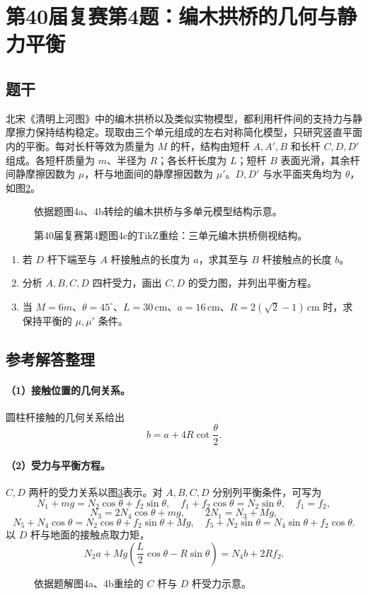 \section{第40届复赛第4题：编木拱桥的几何与静力平衡}
\subsection{题干}
北宋《清明上河图》中的编木拱桥以及类似实物模型，都利用杆件间的支持力与静摩擦力保持结构稳定。现取由三个单元组成的左右对称简化模型，只研究竖直平面内的平衡。每对长杆等效为质量为 $M$ 的杆，结构由短杆 $A,A',B$ 和长杆 $C,D,D'$ 组成。各短杆质量为 $m$、半径为 $R$；各长杆长度为 $L$；短杆 $B$ 表面光滑，其余杆间静摩擦因数为 $\mu$，杆与地面间的静摩擦因数为 $\mu'$。$D,D'$ 与水平面夹角均为 $\theta$，如图\ref{fig:cpho40q04}。
\begin{figure}[htbp]\centering

\caption{依据题图4a、4b转绘的编木拱桥与多单元模型结构示意。}\label{fig:cpho40q04context}
\end{figure}
\begin{figure}[htbp]\centering

\caption{第40届复赛第4题图4c的TikZ重绘：三单元编木拱桥侧视结构。}\label{fig:cpho40q04}
\end{figure}
\begin{enumerate}
\item 若 $D$ 杆下端至与 $A$ 杆接触点的长度为 $a$，求其至与 $B$ 杆接触点的长度 $b$。
\item 分析 $A,B,C,D$ 四杆受力，画出 $C,D$ 的受力图，并列出平衡方程。
\item 当 $M=6m$、$\theta=45^\circ$、$L=30\,\mathrm{cm}$、$a=16\,\mathrm{cm}$、$R=2(\sqrt2-1)\,\mathrm{cm}$ 时，求保持平衡的 $\mu,\mu'$ 条件。
\end{enumerate}
\subsection{参考解答整理}
\paragraph{（1）接触位置的几何关系。}圆柱杆接触的几何关系给出
\[b=a+4R\cot\frac\theta2.\]
\paragraph{（2）受力与平衡方程。} $C,D$ 两杆的受力关系以图\ref{fig:cpho40q04forces}表示。对 $A,B,C,D$ 分别列平衡条件，可写为
\[
N_1+mg=N_2\cos\theta+f_2\sin\theta,\quad
f_1+f_2\cos\theta=N_2\sin\theta,\quad f_1=f_2,
\]
\[N_3=2N_4\cos\theta+mg,\qquad 2N_1=N_3+Mg,
\]
\[
N_5+N_4\cos\theta=N_2\cos\theta+f_2\sin\theta+Mg,
\quad f_5+N_2\sin\theta=N_4\sin\theta+f_2\cos\theta.
\]
以 $D$ 杆与地面的接触点取力矩，
\[
N_2a+Mg\left(\frac L2\cos\theta-R\sin\theta\right)=N_4b+2Rf_2.
\]
\begin{figure}[htbp]\centering

\caption{依据题解图4a、4b重绘的 $C$ 杆与 $D$ 杆受力示意。}\label{fig:cpho40q04forces}
\end{figure}

